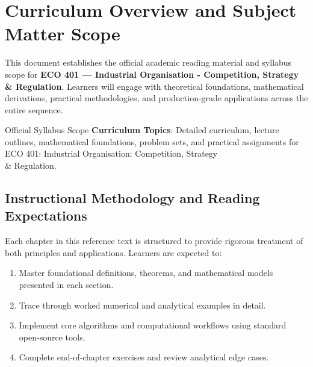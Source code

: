 \section{Curriculum Overview and Subject Matter Scope}

This document establishes the official academic reading material and syllabus scope for \textbf{ECO 401 --- Industrial Organisation - Competition, Strategy \& Regulation}. Learners will engage with theoretical foundations, mathematical derivations, practical methodologies, and production-grade applications across the entire sequence.

\begin{InsightBox}{Official Syllabus Scope}
  \textbf{Curriculum Topics}: Detailed curriculum, lecture outlines, mathematical foundations, problem sets, and practical assignments for ECO 401: Industrial Organisation: Competition, Strategy \\& Regulation.
\end{InsightBox}

\subsection{Instructional Methodology and Reading Expectations}

Each chapter in this reference text is structured to provide rigorous treatment of both principles and applications. Learners are expected to:
\begin{enumerate}
  \item Master foundational definitions, theorems, and mathematical models presented in each section.
  \item Trace through worked numerical and analytical examples in detail.
  \item Implement core algorithms and computational workflows using standard open-source tools.
  \item Complete end-of-chapter exercises and review analytical edge cases.
\end{enumerate}


